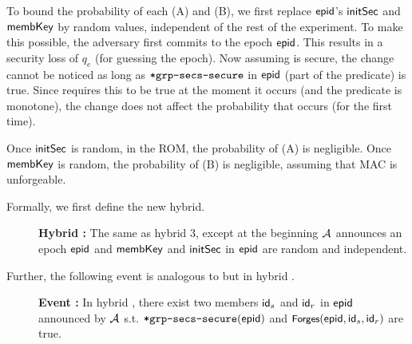 To bound the probability of each (A) and (B), we first replace ${\normalfont\textsf{epid}}$'s ${\mathsf{initSec}}$ and ${\mathsf{membKey}}$ by random values, independent of the rest of the experiment. To make this possible, the adversary first commits to the epoch ${\normalfont\textsf{epid}}$. This results in a security loss of $q_e$ (for guessing the epoch).
Now assuming \mmPKE is secure, the change cannot be noticed as long as ${\textnormal{\tt*grp-secs-secure}}$ in ${\normalfont\textsf{epid}}$ (part of the \KwConf{} predicate) is true. Since \forgess requires this to be true at the moment it occurs (and the predicate is monotone), the change does not affect the probability that \forgess occurs (for the first time).

Once ${\mathsf{initSec}}$ is random, in the ROM, the probability of (A) is negligible. Once ${\mathsf{membKey}}$ is random, the probability of (B) is negligible, assuming that MAC is unforgeable.

Formally, we first define the new hybrid.
\begin{description}
  \item[] {\bf Hybrid \hybridThreeN : } The same as hybrid 3, except at the beginning $\mathcal{A}_{\relax}$ announces an epoch ${\normalfont\textsf{epid}}$ and ${\mathsf{membKey}}$ and ${\mathsf{initSec}}$ in ${\normalfont\textsf{epid}}$ are random and independent.
\end{description}

Further, the following event is analogous to \forgess but in hybrid \hybridThreeN.
\begin{description}
  \item[] {\bf Event \forgessN : } In hybrid \hybridThreeN, there exist two members ${\mathsf{id}}_s$ and ${\mathsf{id}}_r$ in ${\normalfont\textsf{epid}}$ announced by $\mathcal{A}_{\relax}$ s.t. ${\textnormal{\tt*grp-secs-secure}}({\normalfont\textsf{epid}})$ and $\textnormal{\textsf{\small Forges}}({\normalfont\textsf{epid}}, {\mathsf{id}}_s, {\mathsf{id}}_r)$ are true.
\end{description}

